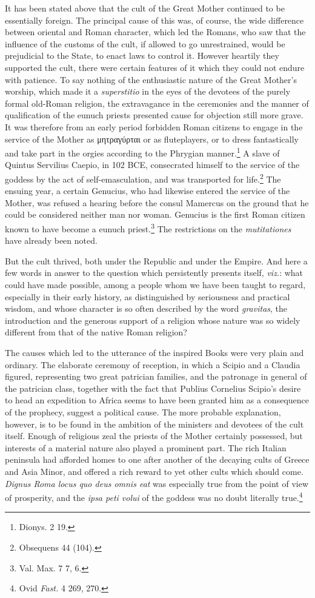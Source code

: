 \documentclass[a4paper, 11pt, oneside, polutonikogreek, french]{article}
\begin{document}
It has been stated above that the cult of the Great Mother continued to be essentially foreign. The principal cause of this was, of course, the wide difference between oriental and Roman character, which led the Romans, who saw that the influence of the customs of the cult, if allowed to go unrestrained, would be prejudicial to the State, to enact laws to control it. However heartily they supported the cult, there were certain features of it which they could not endure with patience. To say nothing of the enthusiastic nature of the Great Mother's worship, which made it a \emph{superstitio} in the eyes of the devotees of the purely formal old-Roman religion, the extravagance in the ceremonies and the manner of qualification of the eunuch priests presented cause for objection still more grave. It was therefore from an early period forbidden Roman citizens to engage in the service of the Mother as μητραγύρται or as fluteplayers, or to dress fantastically and take part in the orgies according to the Phrygian manner.\footnote{Dionys. 2 19.} A slave of Quintus Servilius Caepio, in 102 \textsc{BCE}, consecrated himself to the service of the goddess by the act of self-emasculation, and was transported for life.\footnote{Obsequens 44 (104).} The ensuing year, a certain Genucius, who had likewise entered the service of the Mother, was refused a hearing before the consul Mamercus on the ground that he could be considered neither man nor woman. Genucius is the first Roman citizen known to have become a eunuch priest.\footnote{Val. Max. 7 7, 6.} The restrictions on the \emph{mutitationes} have already been noted.

But the cult thrived, both under the Republic and under the Empire. And here a few words in answer to the question which persistently presents itself, \emph{viz.}: what could have made possible, among a people whom we have been taught to regard, especially in their early history, as distinguished by seriousness and practical wisdom, and whose character is so often described by the word \emph{gravitas}, the introduction and the generous support of a religion whose nature was so widely different from that of the native Roman religion?

The causes which led to the utterance of the inspired Books were very plain and ordinary. The elaborate ceremony of reception, in which a Scipio and a Claudia figured, representing two great patrician families, and the patronage in general of the patrician class, together with the fact that Publius Cornelius Scipio's desire to head an expedition to Africa seems to have been granted him as a consequence of the prophecy, suggest a political cause. The more probable explanation, however, is to be found in the ambition of the ministers and devotees of the cult itself. Enough of religious zeal the priests of the Mother certainly possessed, but interests of a material nature also played a prominent part. The rich Italian peninsula had afforded homes to one after another of the decaying cults of Greece and Asia Minor, and offered a rich reward to yet other cults which should come. \emph{Dignus Roma locus quo deus omnis eat} was especially true from the point of view of prosperity, and the \emph{ipsa peti volui} of the goddess was no doubt literally true.\footnote{Ovid \emph{Fast.} 4 269, 270.}
\end{document}

